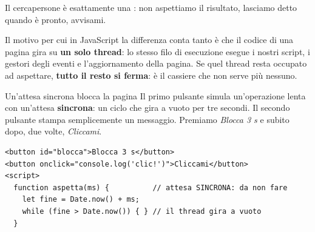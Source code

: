 Il cercapersone è esattamente una : non aspettiamo il risultato,
lasciamo detto \guillemotleft quando è pronto, avvisami\guillemotright.

Il motivo per cui in JavaScript la differenza conta tanto è che il codice di una
pagina gira su \textbf{un solo thread}: lo stesso filo di esecuzione esegue i
nostri script, i gestori degli eventi e l'aggiornamento della pagina. Se quel
thread resta occupato ad aspettare, \textbf{tutto il resto si ferma}: è il
cassiere che non serve più nessuno.

\begin{esempio}{Un'attesa sincrona blocca la pagina}
Il primo pulsante simula un'operazione lenta con un'attesa
\textbf{sincrona}: un ciclo che gira a vuoto per tre secondi. Il secondo
pulsante stampa semplicemente un messaggio. Premiamo \textit{Blocca 3 s} e
subito dopo, due volte, \textit{Cliccami}.

\begin{affianco}[0.53][c]
\codicepiccolo
\begin{lstlisting}[style=html, name=attesa-sincrona.html]
<button id="blocca">Blocca 3 s</button>
<button onclick="console.log('clic!')">Cliccami</button>
<script>
  function aspetta(ms) {          // attesa SINCRONA: da non fare
    let fine = Date.now() + ms;
    while (fine > Date.now()) { } // il thread gira a vuoto
  }


\end{lstlisting}
\end{affianco}
\end{esempio}
